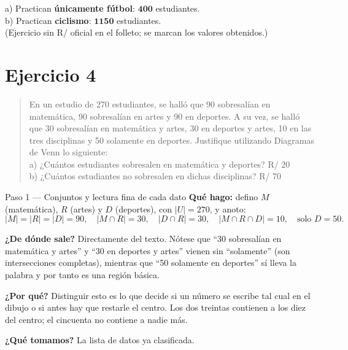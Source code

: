 \documentclass[11pt]{article}
\begin{document}
\begin{resp}
a) Practican \textbf{únicamente fútbol}: $\mathbf{400}$ estudiantes.\\
b) Practican \textbf{ciclismo}: $\mathbf{1150}$ estudiantes.\\
(Ejercicio sin R/ oficial en el folleto; se marcan los valores obtenidos.)
\end{resp}

\section*{Ejercicio 4}

\begin{quote}
En un estudio de 270 estudiantes, se halló que 90 sobresalían en matemática, 90 sobresalían en artes y 90
en deportes. A su vez, se halló que 30 sobresalían en matemática y artes, 30 en deportes y artes, 10 en
las tres disciplinas y 50 solamente en deportes. Justifique utilizando Diagramas de Venn lo siguiente:\\
a) ¿Cuántos estudiantes sobresalen en matemática y deportes? \hfill R/ 20\\
b) ¿Cuántos estudiantes no sobresalen en dichas disciplinas? \hfill R/ 70
\end{quote}

\begin{paso}{Paso 1 --- Conjuntos y lectura fina de cada dato}
\textbf{Qué hago:} defino $M$ (matemática), $R$ (artes) y $D$ (deportes), con $|U|=270$, y anoto:
\[
|M|=|R|=|D|=90,\quad |M\cap R|=30,\quad |D\cap R|=30,\quad |M\cap R\cap D|=10,\quad \text{solo }D=50 .
\]

\textbf{¿De dónde sale?} Directamente del texto. Nótese que ``30 sobresalían en matemática y artes'' y
``30 en deportes y artes'' vienen sin ``solamente'' (son intersecciones completas), mientras que ``50
solamente en deportes'' sí lleva la palabra y por tanto es una región básica.

\textbf{¿Por qué?} Distinguir esto es lo que decide si un número se escribe tal cual en el dibujo o si
antes hay que restarle el centro. Los dos treintas contienen a los diez del centro; el cincuenta no
contiene a nadie más.

\textbf{¿Qué tomamos?} La lista de datos ya clasificada.
\end{paso}
\end{document}
